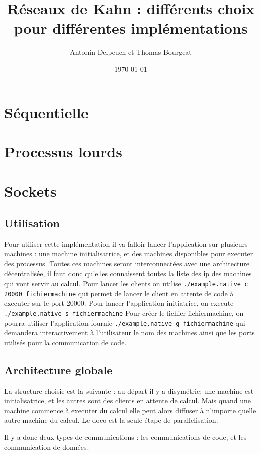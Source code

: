 \documentclass[a4paper]{article}
\begin{document}
\title{Réseaux de Kahn : différents choix pour différentes
implémentations }
\author{Antonin Delpeuch et Thomas Bourgeat}
\date{\today}

\maketitle

\section{Séquentielle}
\section{Processus lourds}
\section{Sockets}
\subsection{Utilisation}
Pour utiliser cette implémentation il va falloir lancer 
l'application sur plusieurs machines : une machine initialisatrice, et
des machines disponibles pour executer des processus. Toutes ces machines seront
interconnectées avec une architecture décentralisée, il faut donc
qu'elles connaissent toutes la liste des ip des machines qui vont servir
au calcul.
Pour lancer les clients on utilise \texttt{./example.native c 20000
fichiermachine} qui
permet de lancer le client en attente de code à executer sur le port
20000.
Pour lancer l'application initiatrice, on execute \texttt{./example.native s
fichiermachine}
Pour créer le fichier fichiermachine, on pourra utiliser l'application
fournie \texttt{./example.native g fichiermachine} qui demandera interactivement à
l'utilisateur le nom des machines ainsi que les ports utilisés pour la
communication de code.
\subsection{Architecture globale}
La structure choisie est la suivante : au départ il y a disymétrie: une
machine est initialisatrice, et les autres sont des clients en attente de
calcul. Mais quand une machine commence à executer du calcul elle peut
alors diffuser à n'importe quelle autre machine du calcul. Le doco est la seule étape de
parallelisation.

Il y a donc deux types de communications : les communications de code, et
les communication de données.
\end{document}
